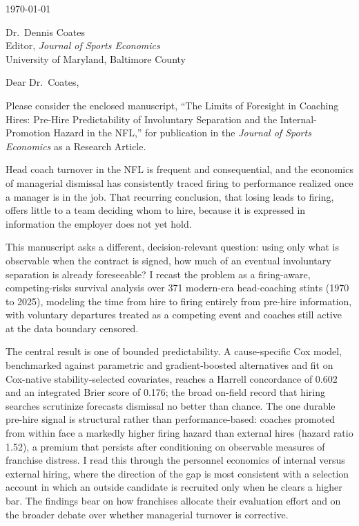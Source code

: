\documentclass[12pt,USenglish]{article}
\begin{document}
\today

\bigskip

Dr.\ Dennis Coates\\
Editor, \emph{Journal of Sports Economics}\\
University of Maryland, Baltimore County

\bigskip

Dear Dr.\ Coates,

Please consider the enclosed manuscript, ``The Limits of Foresight in Coaching Hires: Pre-Hire Predictability of Involuntary Separation and the Internal-Promotion Hazard in the NFL,'' for publication in the \emph{Journal of Sports Economics} as a Research Article.

Head coach turnover in the NFL is frequent and consequential, and the economics of managerial dismissal has consistently traced firing to performance realized once a manager is in the job. That recurring conclusion, that losing leads to firing, offers little to a team deciding whom to hire, because it is expressed in information the employer does not yet hold.

This manuscript asks a different, decision-relevant question: using only what is observable when the contract is signed, how much of an eventual involuntary separation is already foreseeable? I recast the problem as a firing-aware, competing-risks survival analysis over 371 modern-era head-coaching stints (1970 to 2025), modeling the time from hire to firing entirely from pre-hire information, with voluntary departures treated as a competing event and coaches still active at the data boundary censored.

The central result is one of bounded predictability. A cause-specific Cox model, benchmarked against parametric and gradient-boosted alternatives and fit on Cox-native stability-selected covariates, reaches a Harrell concordance of 0.602 and an integrated Brier score of 0.176; the broad on-field record that hiring searches scrutinize forecasts dismissal no better than chance. The one durable pre-hire signal is structural rather than performance-based: coaches promoted from within face a markedly higher firing hazard than external hires (hazard ratio 1.52), a premium that persists after conditioning on observable measures of franchise distress. I read this through the personnel economics of internal versus external hiring, where the direction of the gap is most consistent with a selection account in which an outside candidate is recruited only when he clears a higher bar. The findings bear on how franchises allocate their evaluation effort and on the broader debate over whether managerial turnover is corrective.
\end{document}
